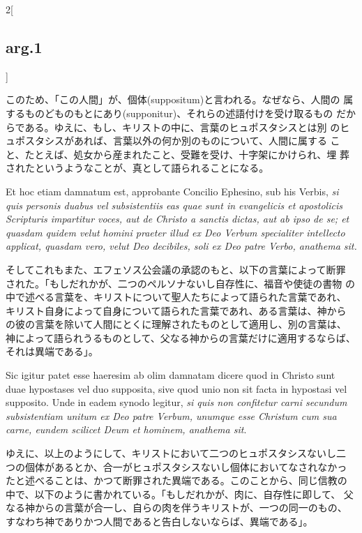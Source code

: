 \documentclass[paper=a4paper,fontsize=10pt,jafontsize=9pt,titlepage]{jlreq}
\begin{document}
\begin{paracol}{2}[\subsection{arg.1}]
\switchcolumn

このため、「この人間」が、個体(suppositum)と言われる。なぜなら、人間の
属するものどものもとにあり(supponitur)、それらの述語付けを受け取るもの
だからである。ゆえに、もし、キリストの中に、言葉のヒュポスタシスとは別
のヒュポスタシスがあれば、言葉以外の何か別のものについて、人間に属する
こと、たとえば、処女から産まれたこと、受難を受け、十字架にかけられ、埋
葬されたというようなことが、真として語られることになる。

\switchcolumn*

Et hoc etiam damnatum est, approbante Concilio Ephesino, sub his
Verbis, {\itshape si quis personis duabus vel subsistentiis eas quae
sunt in evangelicis et apostolicis Scripturis impartitur voces, aut de
Christo a sanctis dictas, aut ab ipso de se; et quasdam quidem velut
homini praeter illud ex Deo Verbum specialiter intellecto applicat,
quasdam vero, velut Deo decibiles, soli ex Deo patre Verbo, anathema
sit. }

\switchcolumn

そしてこれもまた、エフェソス公会議の承認のもと、以下の言葉によって断罪
された。「もしだれかが、二つのペルソナないし自存性に、福音や使徒の書物
の中で述べる言葉を、キリストについて聖人たちによって語られた言葉であれ、
キリスト自身によって自身について語られた言葉であれ、ある言葉は、神から
の彼の言葉を除いて人間にとくに理解されたものとして適用し、別の言葉は、
神によって語られうるものとして、父なる神からの言葉だけに適用するならば、
それは異端である」。

\switchcolumn*

Sic igitur patet esse haeresim ab olim damnatam dicere quod in Christo
sunt duae hypostases vel duo supposita, sive quod unio non sit facta
in hypostasi vel supposito. Unde in eadem synodo legitur, {\itshape si
quis non confitetur carni secundum subsistentiam unitum ex Deo patre
Verbum, unumque esse Christum cum sua carne, eundem scilicet Deum et
hominem, anathema sit}.

\switchcolumn

ゆえに、以上のようにして、キリストにおいて二つのヒュポスタシスないし二
つの個体があるとか、合一がヒュポスタシスないし個体においてなされなかっ
たと述べることは、かつて断罪された異端である。このことから、同じ信教の
中で、以下のように書かれている。「もしだれかが、肉に、自存性に即して、
父なる神からの言葉が合一し、自らの肉を伴うキリストが、一つの同一のもの、
すなわち神でありかつ人間であると告白しないならば、異端である」。

\switchcolumn*[\subsection{ad.1}]


\end{paracol}
\end{document}
